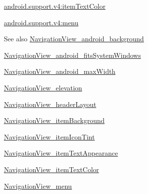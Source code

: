 {\ttfamily \hyperlink{classandroid_1_1support_1_1v4_1_1R_1_1styleable_a23b2727a764707c6a7ea9c2eabf7a8d7}{android.\+support.\+v4\+:item\+Text\+Color}}

{\ttfamily \hyperlink{classandroid_1_1support_1_1v4_1_1R_1_1styleable_a190d0d0a640befa4ce35b45bf2f3a67f}{android.\+support.\+v4\+:menu}}

\begin{DoxySeeAlso}{See also}
\hyperlink{classandroid_1_1support_1_1v4_1_1R_1_1styleable_a8f98df409afda107e7ee23053b8a05b9}{Navigation\+View\+\_\+android\+\_\+background} 

\hyperlink{classandroid_1_1support_1_1v4_1_1R_1_1styleable_a8517e1a9f5ffb52c3548a89bc9417529}{Navigation\+View\+\_\+android\+\_\+fits\+System\+Windows} 

\hyperlink{classandroid_1_1support_1_1v4_1_1R_1_1styleable_ad0e7d3e854013e3ffc4d6bc317d99c0c}{Navigation\+View\+\_\+android\+\_\+max\+Width} 

\hyperlink{classandroid_1_1support_1_1v4_1_1R_1_1styleable_ac60a6df259fa99f7015ffb729a6e9f61}{Navigation\+View\+\_\+elevation} 

\hyperlink{classandroid_1_1support_1_1v4_1_1R_1_1styleable_a8beaea7d5f50233cb1a16143dfc217c8}{Navigation\+View\+\_\+header\+Layout} 

\hyperlink{classandroid_1_1support_1_1v4_1_1R_1_1styleable_afc0d87aca6dd3fb4c0540b58a90cca8e}{Navigation\+View\+\_\+item\+Background} 

\hyperlink{classandroid_1_1support_1_1v4_1_1R_1_1styleable_a66c3c759347c63fdcb441cb6933140c5}{Navigation\+View\+\_\+item\+Icon\+Tint} 

\hyperlink{classandroid_1_1support_1_1v4_1_1R_1_1styleable_a349ff552ebf7326a68f420379297db8e}{Navigation\+View\+\_\+item\+Text\+Appearance} 

\hyperlink{classandroid_1_1support_1_1v4_1_1R_1_1styleable_a23b2727a764707c6a7ea9c2eabf7a8d7}{Navigation\+View\+\_\+item\+Text\+Color} 

\hyperlink{classandroid_1_1support_1_1v4_1_1R_1_1styleable_a190d0d0a640befa4ce35b45bf2f3a67f}{Navigation\+View\+\_\+menu} 
\end{DoxySeeAlso}
\mbox{\label{classandroid_1_1support_1_1v4_1_1R_1_1styleable_a8f98df409afda107e7ee23053b8a05b9}} 
